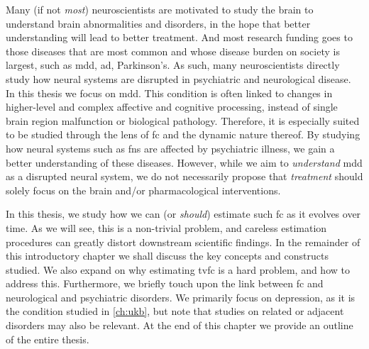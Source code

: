 Many (if not \emph{most}) neuroscientists are motivated to study the brain to understand brain abnormalities and disorders, in the hope that better understanding will lead to better treatment.
And most research funding goes to those diseases that are most common and whose disease burden on society is largest, such as \gls{mdd}, \gls{ad}, Parkinson's.
As such, many neuroscientists directly study how neural systems are disrupted in psychiatric and neurological disease.
%
In this thesis we focus on \gls{mdd}.
This condition is often linked to changes in higher-level and complex affective and cognitive processing, instead of single brain region malfunction or biological pathology.
Therefore, it is especially suited to be studied through the lens of \gls{fc} and the dynamic nature thereof.
By studying how neural systems such as \glspl{fn} are affected by psychiatric illness, we gain a better understanding of these diseases.
However, while we aim to \emph{understand} \gls{mdd} as a disrupted neural system, we do not necessarily propose that \emph{treatment} should solely focus on the brain and/or pharmacological interventions.

In this thesis, we study how we can (or \emph{should}) estimate such \gls{fc} as it evolves over time.
As we will see, this is a non-trivial problem, and careless estimation procedures can greatly distort downstream scientific findings.
In the remainder of this introductory chapter we shall discuss the key concepts and constructs studied.
We also expand on why estimating \gls{tvfc} is a hard problem, and how to address this.
Furthermore, we briefly touch upon the link between \gls{fc} and neurological and psychiatric disorders.
We primarily focus on depression, as it is the condition studied in \cref{ch:ukb}, but note that studies on related or adjacent disorders may also be relevant.
At the end of this chapter we provide an outline of the entire thesis.
